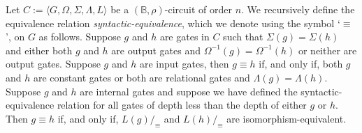 \documentclass[../paper.tex]{subfiles}
\begin{document}



\begin{definition}
  Let $C := \langle G, \Omega, \Sigma, \Lambda, L \rangle$ be a $(\mathbb{B},
  \rho)$-circuit of order $n$. We recursively define the equivalence relation
  \emph{syntactic-equivalence}, which we denote using the symbol `$\equiv$', on
  $G$ as follows. Suppose $g$ and $h$ are gates in $C$ such that $\Sigma (g) =
  \Sigma(h)$ and either both $g$ and $h$ are output gates and $\Omega^{-1}(g) =
  \Omega^{-1}(h)$ or neither are output gates. Suppose $g$ and $h$ are input
  gates, then $g \equiv h$ if, and only if, both $g$ and $h$ are constant gates
  or both are relational gates and $\Lambda(g) = \Lambda (h)$. Suppose $g$ and
  $h$ are internal gates and suppose we have defined the syntactic-equivalence
  relation for all gates of depth less than the depth of either $g$ or $h$. Then
  $g \equiv h$ if, and only if, $L(g) /_\equiv$ and $L(h) /_\equiv$ are
  isomorphism-equivalent.
\end{definition}
\end{document}
